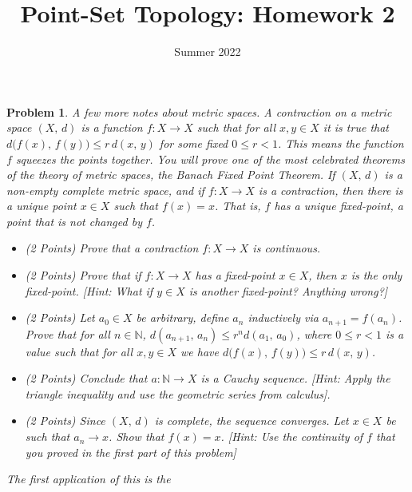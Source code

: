 \documentclass{article}
\title{Point-Set Topology: Homework 2}
\date{Summer 2022}
\theoremstyle{normal}
\newtheorem{problem}{Problem}
\begin{document}
    \maketitle
    \begin{problem}
        A few more notes about metric spaces. A \textit{contraction} on a
        metric space $(X,\,d)$ is a function $f:X\rightarrow{X}$ such that
        for all $x,y\in{X}$ it is true that
        $d\big(f(x),\,f(y)\big)\leq{r}\,d(x,\,y)$ for some fixed $0\leq{r}<1$.
        This means the function $f$ \textit{squeezes} the points together.
        You will prove one of the most celebrated theorems of the theory of
        metric spaces, the \textit{Banach Fixed Point Theorem}.
        If $(X,\,d)$ is a non-empty complete metric space, and if
        $f:X\rightarrow{X}$ is
        a contraction, then there is a unique point $x\in{X}$ such that
        $f(x)=x$. That is, $f$ has a unique \textit{fixed-point}, a point that
        is not changed by $f$.
        \begin{itemize}
            \item (2 Points) Prove that a contraction $f:X\rightarrow{X}$ is
                continuous.
            \item (2 Points) Prove that if $f:X\rightarrow{X}$ has a
                fixed-point $x\in{X}$, then $x$ is the only fixed-point.
                [Hint: What if $y\in{X}$ is another fixed-point?
                Anything wrong?]
            \item (2 Points) Let $a_{0}\in{X}$ be arbitrary, define $a_{n}$
                inductively via $a_{n+1}=f(a_{n})$. Prove that for all
                $n\in\mathbb{N}$,
                $d(a_{n+1},\,a_{n})\leq{r}^{n}d(a_{1},\,a_{0})$, where
                $0\leq{r}<1$ is a value such that for all
                $x,y\in{X}$ we have
                $d\big(f(x),\,f(y)\big)\leq{r}\,d(x,\,y)$.
            \item (2 Points) Conclude that $a:\mathbb{N}\rightarrow{X}$ is a
                Cauchy sequence. [Hint: Apply the triangle inequality and use
                the geometric series from calculus].
            \item (2 Points) Since $(X,\,d)$ is complete, the sequence
            converges. Let $x\in{X}$ be such that
            $a_{n}\rightarrow{x}$. Show that $f(x)=x$.
            [Hint: Use the continuity of $f$ that you proved in the first part
            of this problem]
        \end{itemize}
        The first application of this is the

\end{problem}
\end{document}
